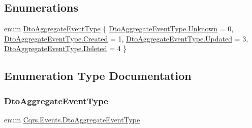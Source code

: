 \subsection*{Enumerations}
\begin{DoxyCompactItemize}
\item 
enum \hyperlink{namespaceCqrs_1_1Events_a2a32e13adeac92f5a93966cd8ee2d39a_a2a32e13adeac92f5a93966cd8ee2d39a}{Dto\+Aggregate\+Event\+Type} \{ \hyperlink{namespaceCqrs_1_1Events_a2a32e13adeac92f5a93966cd8ee2d39a_a2a32e13adeac92f5a93966cd8ee2d39aa88183b946cc5f0e8c96b2e66e1c74a7e}{Dto\+Aggregate\+Event\+Type.\+Unknown} = 0, 
\hyperlink{namespaceCqrs_1_1Events_a2a32e13adeac92f5a93966cd8ee2d39a_a2a32e13adeac92f5a93966cd8ee2d39aa0eceeb45861f9585dd7a97a3e36f85c6}{Dto\+Aggregate\+Event\+Type.\+Created} = 1, 
\hyperlink{namespaceCqrs_1_1Events_a2a32e13adeac92f5a93966cd8ee2d39a_a2a32e13adeac92f5a93966cd8ee2d39aaff0a3b7f3daef040faf89a88fdac01b7}{Dto\+Aggregate\+Event\+Type.\+Updated} = 3, 
\hyperlink{namespaceCqrs_1_1Events_a2a32e13adeac92f5a93966cd8ee2d39a_a2a32e13adeac92f5a93966cd8ee2d39aa5fe6005bf6e415c950c011fb65f12b8f}{Dto\+Aggregate\+Event\+Type.\+Deleted} = 4
 \}
\end{DoxyCompactItemize}


\subsection{Enumeration Type Documentation}
\mbox{\label{namespaceCqrs_1_1Events_a2a32e13adeac92f5a93966cd8ee2d39a_a2a32e13adeac92f5a93966cd8ee2d39a}} 
\subsubsection{\texorpdfstring{Dto\+Aggregate\+Event\+Type}{DtoAggregateEventType}}
{\footnotesize\ttfamily enum \hyperlink{namespaceCqrs_1_1Events_a2a32e13adeac92f5a93966cd8ee2d39a_a2a32e13adeac92f5a93966cd8ee2d39a}{Cqrs.\+Events.\+Dto\+Aggregate\+Event\+Type}\hspace{0.3cm}{\ttfamily [strong]}}

